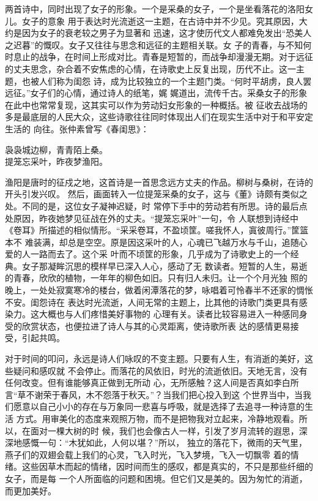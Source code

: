 \documentclass[12pt,a4paper]{article}
\begin{document}
		两首诗中，同时出现了女子的形象。一个是采桑的女子，一个是坐看落花的洛阳女儿。女子的意象
	用于表达时光流逝这一主题，在古诗中并不少见。究其原因，大约是因为女子的衰老较之男子为显著和
	迅速，这才使历代文人都难免发出“恐美人之迟暮”的慨叹。女子又往往与思念和远征的主题相关联。女
	子的青春，与不知何时息止的战争，在时间上形成对比。青春是短暂的，而战争却漫漫无期。对于远征
	的丈夫思念，杂合着不安焦虑的心情，在诗歌史上反复出现，历代不止。这一主题，也被人们称为闺怨
	诗，成为比较独立的一个主题门类。“何时平胡虏，良人罢远征。”女子们的心情，通过诗人的纸笔，娓
	娓道出，流传千古。采桑女子的形象在此中也常常复现，这其实可以作为劳动妇女形象的一种概括。被
	征收去战场的多是最底层的人民大众，这些诗歌往往同时体现出人们在现实生活中对于和平安定生活的
	向往。张仲素曾写《春闺思》：

		\shortpoem{}{}{}
		袅袅城边柳，青青陌上桑。\\
		提笼忘采叶，昨夜梦渔阳。\\
		\endshortpoem

		渔阳是唐时的征戍之地，这首诗是一首思念远方丈夫的作品。柳树与桑树，在诗的开头引发兴叹。
	然后，画面转入一位提笼采桑的女子，这与《董》诗颇有类似之处。不同的是，这位女子凝神迟疑，时
	常停下手中的劳动若有所思。诗的最后点处原因，昨夜她梦见征战在外的丈夫。“提笼忘采叶”一句，令
	人联想到诗经中《卷耳》所描述的相似情形。“采采卷耳，不盈顷筐。嗟我怀人，寘彼周行。”筐篮本不
	难装满，却总是空空。原是因这采叶的人，心魂已飞越万水与千山，追随心爱的人一路而去了。这个采
	叶而不顷筐的形象，几乎成为了诗歌史上的一个经典。女子那凝眸沉思的模样早已深入人心，感动了无
	数读者。短暂的人生，易逝的青春，欣欣的植物，一年年的柳色如旧。只有归人未归。让一个个月光独
	照的晚上，一处处寂寞寒冷的楼台，做着闲潭落花的梦，咏唱着可怜春半不还家的惆怅不安。闺怨诗在
	表达时光流逝，人间无常的主题上，比其他的诗歌门类更具有感染力。这大概也与人们疼惜美好事物的
	心理有关。读者比较容易进入一种感同身受的欣赏状态，也便拉进了诗人与其的心灵距离，使诗歌所表
	达的感情更易接受，引起共鸣。

		对于时间的叩问，永远是诗人们咏叹的不变主题。只要有人生，有消逝的美好，这些疑问和感叹就
	不会停止。而落花的风依旧，时光的流逝依旧。天地无言，没有任何改变。但有谁能够真正做到无所动
	心，无所感触？这人间是否真如李白所言“草不谢荣于春风，木不怨落于秋天。”？当我们把心投入到这
	个世界当中，当我们愿意以自己小小的存在与万象同一悲喜与呼吸，就是选择了去追寻一种诗意的生活
	方式。用审美化的态度来观照万物，而不是把物我对立起来，冷静地观看。所以，在面对一棵大树的时
	候，我们也会像古人一样，引发了岁月流转的遐思，深深地感慨一句：“木犹如此，人何以堪？”所以，
	独立的落花下，微雨的天气里，燕子们的双翅会载上我们的心灵，飞入时光，飞入梦境，飞入一切飘零
	着的情绪。这些因草木而起的情绪，因时间而生的感叹，都是真实的，不只是那些纤细的女子，而是每
	一个人所面临的问题和困境。但它们又是美的。因为匆忙的消逝，而更加美好。
\end{document}
